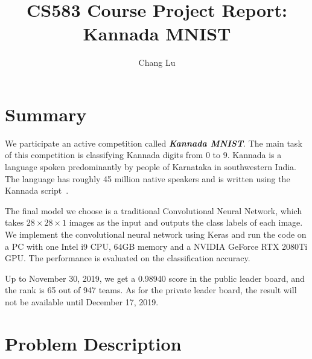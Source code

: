 \documentclass[]{article}
\title{\textbf{CS583 Course Project Report: Kannada MNIST}}
\author{Chang Lu}
\begin{document}
\maketitle

\section{Summary}
We participate an active competition called \textit{\textbf{Kannada MNIST}}. The main task of this competition is classifying Kannada digits from 0 to 9. Kannada is a language spoken predominantly by people of Karnataka in southwestern India. The language has roughly 45 million native speakers and is written using the Kannada script~\cite{wiki:Kannada}.

The final model we choose is a traditional Convolutional Neural Network, which takes $28 \times 28 \times 1$ images as the input and outputs the class labels of each image. We implement the convolutional neural network using Keras and run the code on a PC with one Intel i9 CPU, 64GB memory and a NVIDIA GeForce RTX 2080Ti GPU. The performance is evaluated on the classification accuracy.

Up to November 30, 2019, we get a 0.98940 score in the public leader board, and the rank is 65 out of 947 teams. As for the private leader board, the result will not be available until December 17, 2019.

\section{Problem Description}
\end{document}
